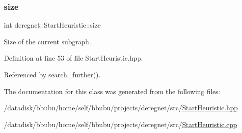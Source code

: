 \subsubsection{\texorpdfstring{size}{size}}
{\footnotesize\ttfamily int deregnet\+::\+Start\+Heuristic\+::size\hspace{0.3cm}{\ttfamily [private]}}



Size of the current subgraph. 



Definition at line 53 of file Start\+Heuristic.\+hpp.



Referenced by search\+\_\+further().



The documentation for this class was generated from the following files\+:\begin{DoxyCompactItemize}
\item 
/datadisk/bbubu/home/self/bbubu/projects/deregnet/src/\hyperlink{StartHeuristic_8hpp}{Start\+Heuristic.\+hpp}\item 
/datadisk/bbubu/home/self/bbubu/projects/deregnet/src/\hyperlink{StartHeuristic_8cpp}{Start\+Heuristic.\+cpp}\end{DoxyCompactItemize}
